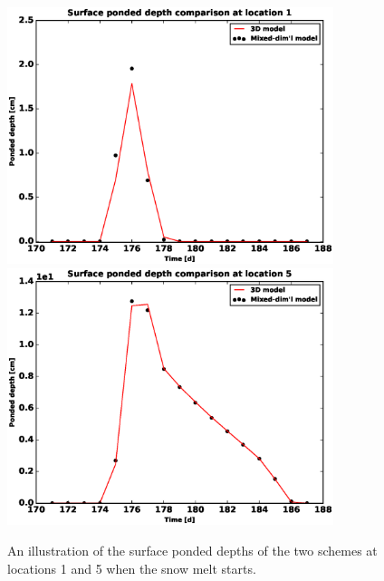 \documentclass[review]{elsarticle}
\begin{document}
\begin{figure}[!htpb]
\centering
\includegraphics[height = 7.5cm, width=6.cm]{figures/comparison/regular/ponded-depth/comp-pd-location1.eps}
\includegraphics[height = 7.5cm, width=6.cm]{figures/comparison/regular/ponded-depth/comp-pd-location5.eps}
\caption{An illustration of the surface ponded depths of the two schemes at locations 1 and 5 when the snow melt starts.}
\label{surf-pd-comp}
\end{figure}
\end{document}
